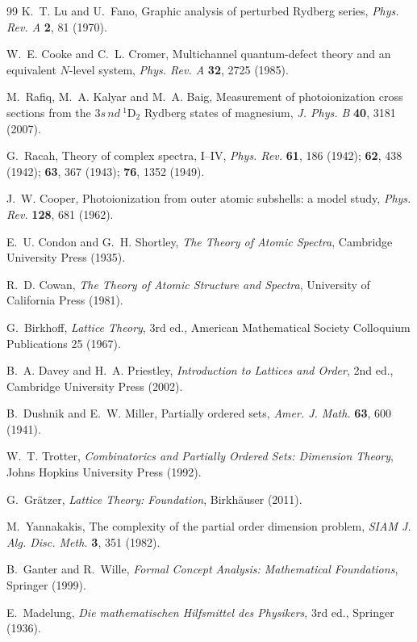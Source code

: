 \documentclass[11pt,a4paper]{article}
\theoremstyle{definition}
\begin{document}
\begin{thebibliography}{99}
 K.~T. Lu and U.~Fano, Graphic analysis of perturbed Rydberg
series, \emph{Phys. Rev. A} \textbf{2}, 81 (1970).

 W.~E. Cooke and C.~L. Cromer, Multichannel quantum-defect
theory and an equivalent $N$-level system, \emph{Phys. Rev. A} \textbf{32}, 2725
(1985).

 M.~Rafiq, M.~A. Kalyar and M.~A. Baig, Measurement of
photoionization cross sections from the $3s\,nd\ ^1$D$_2$ Rydberg states of
magnesium, \emph{J. Phys. B} \textbf{40}, 3181 (2007).

 G.~Racah, Theory of complex spectra, I--IV, \emph{Phys. Rev.}
\textbf{61}, 186 (1942); \textbf{62}, 438 (1942); \textbf{63}, 367 (1943);
\textbf{76}, 1352 (1949).

 J.~W. Cooper, Photoionization from outer atomic subshells: a
model study, \emph{Phys. Rev.} \textbf{128}, 681 (1962).

 E.~U. Condon and G.~H. Shortley, \emph{The Theory of
Atomic Spectra}, Cambridge University Press (1935).

 R.~D. Cowan, \emph{The Theory of Atomic Structure and Spectra},
University of California Press (1981).

 G.~Birkhoff, \emph{Lattice Theory}, 3rd ed., American
Mathematical Society Colloquium Publications 25 (1967).

 B.~A. Davey and H.~A. Priestley, \emph{Introduction to
Lattices and Order}, 2nd ed., Cambridge University Press (2002).

 B.~Dushnik and E.~W. Miller, Partially ordered sets,
\emph{Amer. J. Math.} \textbf{63}, 600 (1941).

 W.~T. Trotter, \emph{Combinatorics and Partially Ordered Sets:
Dimension Theory}, Johns Hopkins University Press (1992).

 G.~Gr\"atzer, \emph{Lattice Theory: Foundation},
Birkh\"auser (2011).

 M.~Yannakakis, The complexity of the partial order
dimension problem, \emph{SIAM J. Alg. Disc. Meth.} \textbf{3}, 351 (1982).

 B.~Ganter and R.~Wille, \emph{Formal Concept Analysis:
Mathematical Foundations}, Springer (1999).

 E.~Madelung, \emph{Die mathematischen Hilfsmittel des
Physikers}, 3rd ed., Springer (1936).


\end{thebibliography}
\end{document}
